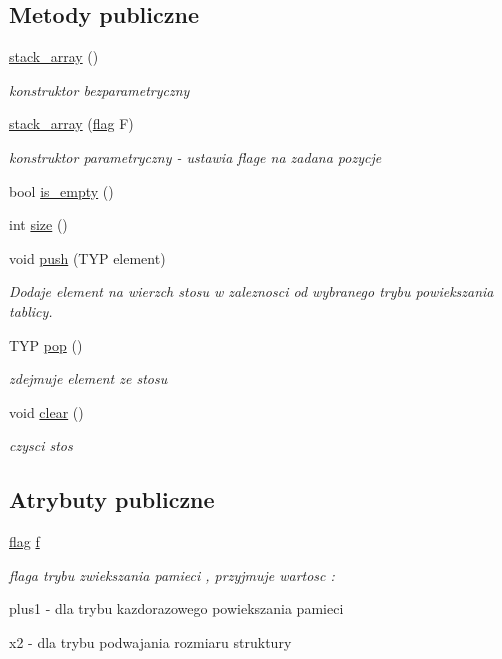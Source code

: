 \subsection*{\-Metody publiczne}
\begin{DoxyCompactItemize}
\item 
\hyperlink{classstack__array_a430ec07ba59152bdb618039ae5f74482}{stack\-\_\-array} ()
\begin{DoxyCompactList}\small\item\em konstruktor bezparametryczny \end{DoxyCompactList}\item 
\hyperlink{classstack__array_ad6ac30696a594fc1f4b58cc94facad9f}{stack\-\_\-array} (\hyperlink{stos_8hh_a7847560c748814fd3070e9149a9578bd}{flag} \-F)
\begin{DoxyCompactList}\small\item\em konstruktor parametryczny -\/ ustawia flage na zadana pozycje \end{DoxyCompactList}\item 
bool \hyperlink{classstack__array_a653b67eb0566e9481e3525dd2f2bc519}{is\-\_\-empty} ()
\item 
int \hyperlink{classstack__array_a26ee4c653f299d3fe03b443f6180d745}{size} ()
\item 
void \hyperlink{classstack__array_ac0d13dd3989ad8dd6689795acc3352cf}{push} (\-T\-Y\-P element)
\begin{DoxyCompactList}\small\item\em \-Dodaje element na wierzch stosu w zaleznosci od wybranego trybu powiekszania tablicy. \end{DoxyCompactList}\item 
\-T\-Y\-P \hyperlink{classstack__array_ad2ce52b1a99f72d383b429dff262b9eb}{pop} ()
\begin{DoxyCompactList}\small\item\em zdejmuje element ze stosu \end{DoxyCompactList}\item 
void \hyperlink{classstack__array_ac55f6fe35d44781d918884e4c466d3ee}{clear} ()
\begin{DoxyCompactList}\small\item\em czysci stos \end{DoxyCompactList}\end{DoxyCompactItemize}
\subsection*{\-Atrybuty publiczne}
\begin{DoxyCompactItemize}
\item 
\hyperlink{stos_8hh_a7847560c748814fd3070e9149a9578bd}{flag} \hyperlink{classstack__array_a06357855e64616369e11f330191413ee}{f}
\begin{DoxyCompactList}\small\item\em flaga trybu zwiekszania pamieci , przyjmuje wartosc \-: \par
 plus1 -\/ dla trybu kazdorazowego powiekszania pamieci \par
 x2 -\/ dla trybu podwajania rozmiaru struktury \end{DoxyCompactList}\end{DoxyCompactItemize}
